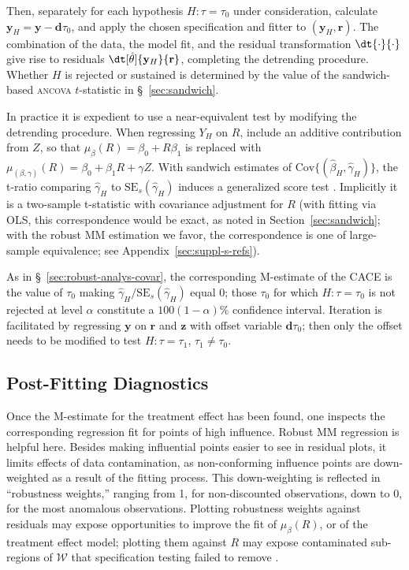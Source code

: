 Then, separately for each hypothesis $H: \tau=\tau_0$ under
consideration, calculate
$\mathbf{y}_{H} = \mathbf{y} - \mathbf{d}\tau_{0}$, and
apply the chosen specification and fitter to
$(\mathbf{y}_{H}, \mathbf{r})$.
The combination of the data, the
model fit, and the residual transformation $\dt{\cdot}{\cdot}$ give rise to residuals
$\dt[\hat\theta]{\mathbf{y}_{H}}{\mathbf{r}}$, completing the
detrending procedure. Whether $H$ is rejected or sustained is
determined by the value of the sandwich-based \textsc{ancova} $t$-statistic
in \S~\ref{sec:sandwich}.

In practice it is expedient to use a near-equivalent
test by modifying the detrending
procedure.
When regressing $Y_{H}$ on $R$, include an additive
contribution from $Z$, so that $\mu_{\beta}(R) =\beta_{0} +
R\beta_{1}$ is replaced with $\mu_{(\beta,\gamma)}(R) =\beta_{0} +
\beta_{1}R + \gamma Z$. With sandwich estimates of
$\text{Cov}\{(\hat{\beta}_{H}, \hat{\gamma}_{H})\}$,
the t-ratio comparing $\hat{\gamma}_{H}$ to
$\text{SE}_{s}(\hat{\gamma}_{H})$ induces a generalized score test \citep{boos1992genscoretest}. Implicitly it is a two-sample
t-statistic with covariance adjustment for $R$ (with fitting via OLS,
this correspondence would be exact, as noted in Section~\ref{sec:sandwich}; with the robust MM estimation we
favor, the correspondence is one of large-sample equivalence; see Appendix~\ref{sec:suppl-s-refs}).

As in \S~\ref{sec:robust-analys-covar}, the corresponding
M-estimate of the CACE is the value of $\tau_{0}$ making
$\hat{\gamma}_{H}/\text{SE}_{s}(\hat{\gamma}_{H})$ equal 0; those $\tau_{0}$ for
which $H: \tau = \tau_{0}$ is not rejected at level $\alpha$
constitute a $100(1-\alpha)\%$ confidence interval.  Iteration is
facilitated by regressing $\mathbf{y}$ on $\mathbf{r}$ and
$\mathbf{z}$ with offset variable $\mathbf{d}\tau_{0}$; then only the
offset needs to be modified to test $H: \tau = \tau_{1}$,
$\tau_{1}\neq \tau_{0}$.


\subsection{Post-Fitting Diagnostics} \label{sec:post-fitt-diagn}
Once the M-estimate for the treatment effect has been found, one
inspects the corresponding regression fit for points of high influence.
Robust MM regression is helpful here.  Besides making
influential points easier to see in residual plots, it limits
effects of data contamination, as non-conforming influence points are
down-weighted as a result of the fitting process. This down-weighting
is reflected in ``robustness weights,'' ranging from 1, for non-discounted
observations, down to 0, for the most anomalous observations.
Plotting %
robustness weights against residuals may expose opportunities to
improve the fit of $\mu_{\beta}(R)$, or of the treatment effect model;
plotting them against $R$ may expose contaminated sub-regions
of $\mathcal{W}$ that specification testing failed to remove
\citep{maronna2006robust}.